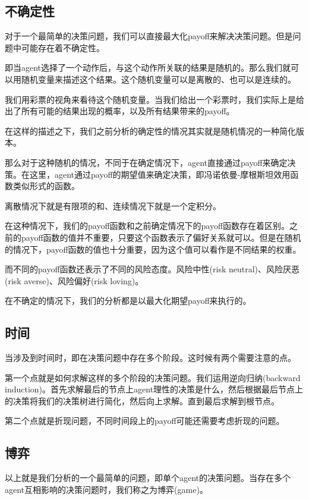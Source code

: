 \documentclass[UTF8,12pt]{ctexart}
\numberwithin{equation}{section} %
\numberwithin{figure}{section}
\numberwithin{table}{section}
\begin{document}
	\subsection{不确定性}
	对于一个最简单的决策问题，我们可以直接最大化payoff来解决决策问题。但是问题中可能存在着不确定性。
	
	即当agent选择了一个动作后，与这个动作所关联的结果是随机的。那么我们就可以用随机变量来描述这个结果。这个随机变量可以是离散的、也可以是连续的。
	
	我们用彩票的视角来看待这个随机变量。当我们给出一个彩票时，我们实际上是给出了所有可能的结果出现的概率，以及所有结果带来的payoff。
	
	在这样的描述之下，我们之前分析的确定性的情况其实就是随机情况的一种简化版本。
	
	那么对于这种随机的情况，不同于在确定情况下，agent直接通过payoff来确定决策。在这里，agent通过payoff的期望值来确定决策，即冯诺依曼-摩根斯坦效用函数类似形式的函数。
	
	离散情况下就是有限项的和、连续情况下就是一个定积分。
	
	在这种情况下，我们的payoff函数和之前确定情况下的payoff函数存在着区别。之前的payoff函数的值并不重要，只要这个函数表示了偏好关系就可以。但是在随机的情况下，payoff函数的值也十分重要，因为这个值可以看作是不同结果的权重。
	
	而不同的payoff函数还表示了不同的风险态度。风险中性(risk neutral)、风险厌恶(risk averse)、风险偏好(risk loving)。
	
	在不确定的情况下，我们的分析都是以最大化期望payoff来执行的。
	
	\subsection{时间}
	当涉及到时间时，即在决策问题中存在多个阶段。这时候有两个需要注意的点。
	
	第一个点就是如何求解这样的多个阶段的决策问题。我们运用逆向归纳(backward induction)。首先求解最后的节点上agent理性的决策是什么，然后根据最后节点上的决策将我们的决策树进行简化，然后向上求解。直到最后求解到根节点。
	
	第二个点就是折现问题，不同时间段上的payoff可能还需要考虑折现的问题。
	
	\subsection{博弈}
	以上就是我们分析的一个最简单的问题，即单个agent的决策问题。当存在多个agent互相影响的决策问题时，我们称之为博弈(game)。
	
\end{document}
